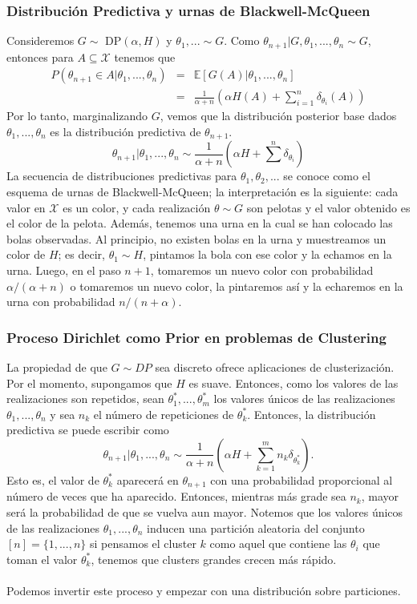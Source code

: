 \documentclass[11pt]{article}
\theoremstyle{plain}
\begin{document}
\subsubsection{Distribución Predictiva y urnas de Blackwell-McQueen}
Consideremos $G \sim \textrm{ DP}(\alpha,H)$ y $\theta_1,... \sim G$. Como $\theta_{n+1} | G, \theta_1,...,\theta_n \sim G$, entonces para $A \subseteq \mathcal{X}$ tenemos que
\begin{eqnarray*}
P(\theta_{n+1} \in A | \theta_1,...,\theta_n ) &=& \mathbb{E}[G(A) | \theta_1,...,\theta_n]\\
                                                                    &=& \frac{1}{\alpha + n} \left(\alpha H(A) + \sum_{i=1}^n \delta_{\theta_i}(A) \right)
\end{eqnarray*}
Por lo tanto, marginalizando $G$, vemos que la distribución posterior base dados $\theta_1,...,\theta_n$ es la distribución predictiva de $\theta_{n+1}$.
\[ \theta_{n+1} | \theta_1,...,\theta_n \sim \frac{1}{\alpha + n} \left( \alpha H + \sum^n \delta_{\theta_i} \right) \]
La secuencia de distribuciones predictivas para $\theta_1, \theta_2,...$ se conoce como el esquema de urnas de Blackwell-McQueen; la interpretación es la siguiente: cada valor en $\mathcal{X}$ es un color, y cada realización $\theta \sim G$ son pelotas y el valor obtenido es el color de la pelota. Además, tenemos una urna en la cual se han colocado las bolas observadas. Al principio, no existen bolas en la urna y muestreamos un color de $H$; es decir, $\theta_1 \sim H$, pintamos la bola con ese color y la echamos en la urna. Luego, en el paso $n+1$, tomaremos un nuevo color con probabilidad $\alpha / (\alpha + n)$ o tomaremos un nuevo color, la pintaremos así y la echaremos en la urna con probabilidad $n / (n+\alpha)$.
\subsubsection{Proceso Dirichlet como Prior en problemas de Clustering}
La propiedad de que $G \sim DP$ sea discreto ofrece aplicaciones de clusterización. Por el momento, supongamos que $H$ es suave. Entonces, como los valores de las realizaciones son repetidos, sean $\theta^\ast_1,...,\theta^\ast_m$ los valores únicos de las realizaciones $\theta_1,...,\theta_n$ y sea $n_k$ el número de repeticiones de $\theta^\ast_k$. Entonces, la distribución predictiva se puede escribir como
\[ \theta_{n+1} | \theta_1,...,\theta_n \sim \frac{1}{\alpha + n} \left( \alpha H + \sum_{k=1}^m n_k \delta_{\theta^\ast_k} \right). \]
Esto es, el valor de $\theta^\ast_k$ aparecerá en $\theta_{n+1}$ con una probabilidad proporcional al número de veces que ha aparecido. Entonces, mientras más grade sea $n_k$, mayor será la probabilidad de que se vuelva aun mayor. Notemos que los valores únicos de las realizaciones $\theta_1,...,\theta_n$ inducen una partición aleatoria del conjunto $[n]=\{1,...,n\}$ si pensamos el cluster $k$ como aquel que contiene las $\theta_i$ que toman el valor $\theta^\ast_k$, tenemos que clusters grandes crecen más rápido.\\
\\
Podemos invertir este proceso y empezar con una distribución sobre particiones.
\end{document}
